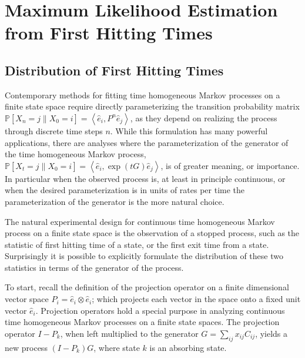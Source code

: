 \chapter{Maximum Likelihood Estimation from First Hitting Times}
\section{Distribution of First Hitting Times}
Contemporary methods for fitting time homogeneous Markov processes on a finite 
state space require directly parameterizing the transition probability matrix $\mathbb{P}\left[X_n = j \left\|X_0 = i \right.\right] = \left\langle \hat{e}_i, P^n \hat{e}_j \right\rangle$,
as they depend on realizing the process through discrete time steps $n$. While this 
formulation has many powerful applications, there are analyses where the parameterization of 
the generator of the time homogeneous Markov process, $\mathbb{P}\left[X_t = j \left\|X_0 = i \right.\right] = \left\langle \hat{e}_i, \exp\left({tG}\right) \hat{e}_j \right\rangle$, 
is of greater meaning, or importance. In particular when the observed process is, at least
in principle continuous, or when the desired parameterization is in units of rates per time
the parameterization of the generator is the more natural choice.

The natural experimental design for continuous time homogeneous Markov process on a finite
state space is the observation of a stopped process, such as the statistic of first hitting 
time of a state, or the first exit time from a state. Surprisingly it is possible to
explicitly formulate the distribution of these two statistics in terms of the generator of
the process.

To start, recall the definition of the projection operator on a finite dimensional vector
space $P_i = \hat{e}_i \otimes \hat{e}_i$; which projects each vector in the space onto a
fixed unit vector $\hat{e}_i$. Projection operators hold a special purpose in analyzing
continuous time homogeneous Markov processes on a finite state spaces. The projection
operator $I-P_k$, when left multiplied to the generator $G = \sum_{ij}x_{ij}C_{ij}$, yields 
a new process $\left(I-P_k\right)G$, where state $k$ is an absorbing state.

